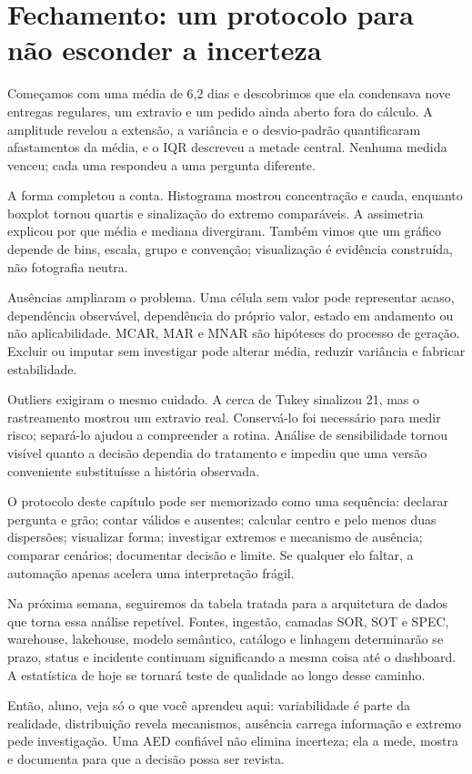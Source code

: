 \section{Fechamento: um protocolo para não esconder a incerteza}

Começamos com uma média de 6,2 dias e descobrimos que ela condensava nove entregas regulares, um extravio e um pedido ainda aberto fora do cálculo. A amplitude revelou a extensão, a variância e o desvio-padrão quantificaram afastamentos da média, e o IQR descreveu a metade central. Nenhuma medida venceu; cada uma respondeu a uma pergunta diferente.

A forma completou a conta. Histograma mostrou concentração e cauda, enquanto boxplot tornou quartis e sinalização do extremo comparáveis. A assimetria explicou por que média e mediana divergiram. Também vimos que um gráfico depende de bins, escala, grupo e convenção; visualização é evidência construída, não fotografia neutra.

Ausências ampliaram o problema. Uma célula sem valor pode representar acaso, dependência observável, dependência do próprio valor, estado em andamento ou não aplicabilidade. MCAR, MAR e MNAR são hipóteses do processo de geração. Excluir ou imputar sem investigar pode alterar média, reduzir variância e fabricar estabilidade.

Outliers exigiram o mesmo cuidado. A cerca de Tukey sinalizou 21, mas o rastreamento mostrou um extravio real. Conservá-lo foi necessário para medir risco; separá-lo ajudou a compreender a rotina. Análise de sensibilidade tornou visível quanto a decisão dependia do tratamento e impediu que uma versão conveniente substituísse a história observada.

O protocolo deste capítulo pode ser memorizado como uma sequência: declarar pergunta e grão; contar válidos e ausentes; calcular centro e pelo menos duas dispersões; visualizar forma; investigar extremos e mecanismo de ausência; comparar cenários; documentar decisão e limite. Se qualquer elo faltar, a automação apenas acelera uma interpretação frágil.

Na próxima semana, seguiremos da tabela tratada para a arquitetura de dados que torna essa análise repetível. Fontes, ingestão, camadas SOR, SOT e SPEC, warehouse, lakehouse, modelo semântico, catálogo e linhagem determinarão se prazo, status e incidente continuam significando a mesma coisa até o dashboard. A estatística de hoje se tornará teste de qualidade ao longo desse caminho.

\begin{SummaryBox}
Então, aluno, veja só o que você aprendeu aqui: variabilidade é parte da realidade, distribuição revela mecanismos, ausência carrega informação e extremo pede investigação. Uma AED confiável não elimina incerteza; ela a mede, mostra e documenta para que a decisão possa ser revista.
\end{SummaryBox}
